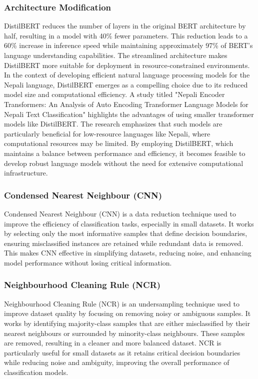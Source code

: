 \subsubsection{Architecture Modification}
DistilBERT reduces the number of layers in the original BERT architecture by half, resulting in a model with 40\% fewer parameters. This reduction leads to a 60\% increase in inference speed while maintaining approximately 97\% of BERT's language understanding capabilities. The streamlined architecture makes DistilBERT more suitable for deployment in resource-constrained environments.
In the context of developing efficient natural language processing models for the Nepali language, DistilBERT emerges as a compelling choice due to its reduced model size and computational efficiency. A study titled "Nepali Encoder Transformers: An Analysis of Auto Encoding Transformer Language Models for Nepali Text Classification" highlights the advantages of using smaller transformer models like DistilBERT. The research emphasizes that such models are particularly beneficial for low-resource languages like Nepali, where computational resources may be limited. By employing DistilBERT, which maintains a balance between performance and efficiency, it becomes feasible to develop robust language models without the need for extensive computational infrastructure.

\subsubsection{Condensed Nearest Neighbour (CNN)}
Condensed Nearest Neighbour (CNN) is a data reduction technique used to improve the efficiency of classification tasks, especially in small datasets. It works by selecting only the most informative samples that define decision boundaries, ensuring misclassified instances are retained while redundant data is removed. This makes CNN effective in simplifying datasets, reducing noise, and enhancing model performance without losing critical information.

\subsubsection{Neighbourhood Cleaning Rule (NCR)}
Neighbourhood Cleaning Rule (NCR) is an undersampling technique used to improve dataset quality by focusing on removing noisy or ambiguous samples. It works by identifying majority-class samples that are either misclassified by their nearest neighbours or surrounded by minority-class neighbours. These samples are removed, resulting in a cleaner and more balanced dataset. NCR is particularly useful for small datasets as it retains critical decision boundaries while reducing noise and ambiguity, improving the overall performance of classification models.

